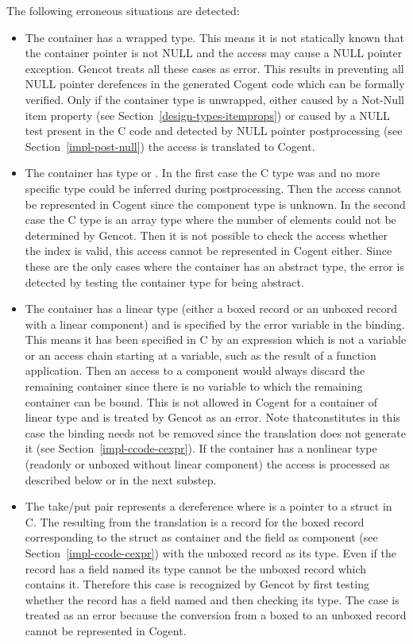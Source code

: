 The following erroneous situations are detected:
\begin{itemize}
\item The container has a  wrapped type. This means it is not statically known that the container pointer is
not NULL and the access may cause a NULL pointer exception. Gencot treats all these cases as error. This results in
preventing all NULL pointer derefences in the generated Cogent code which can be formally verified. Only if the container
type is unwrapped, either caused by a Not-Null item property (see Section~\ref{design-types-itemprops}) or caused by a
NULL test present in the C code and detected by NULL pointer postprocessing (see Section~\ref{impl-post-null}) the access
is translated to Cogent.
\item The container has type  or . In the first case the C type was  and no more
specific type could be inferred during postprocessing. Then the access cannot be represented in Cogent since the component
type is unknown. In the second case the C type is an array type where the number of elements could not be determined by
Gencot. Then it is not possible to check the access whether the index is valid, this access cannot be represented in
Cogent either. Since these are the only cases where the container has an abstract type, the error is detected by testing
the container type for being abstract.
\item The container has a linear type (either a boxed record or an unboxed record with a linear component) and is specified
by the error variable in the  binding. This means it has been specified in C by an expression which is not a
variable or an access chain starting at a variable, such as the result of a function application. Then an access to a
component would always discard the remaining container since there is no variable to which the remaining container can be
bound. This is not allowed in Cogent for a container of linear type and is treated by Gencot as an error. Note thatconstitutes in this
case the  binding needs not be removed since the translation does not generate it (see Section~\ref{impl-ccode-cexpr}).
If the container has a nonlinear type (readonly or unboxed without linear component) the access is processed as
described below or in the next substep.
\item The take/put pair represents a dereference  where  is a pointer to a struct in C. The 
resulting from the translation is a record  for the boxed record corresponding to the struct as container and
the field  as component (see Section~\ref{impl-ccode-cexpr}) with the unboxed record as its type. Even if the
record has a field named  its type cannot be the unboxed record which contains it. Therefore this case is
recognized by Gencot by first testing whether the record has a field named  and then checking its type. The
case is treated as an error because the conversion from a boxed to an unboxed record cannot be represented in Cogent.
\end{itemize}

